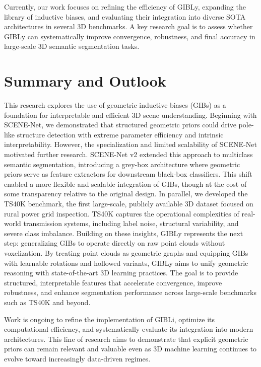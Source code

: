 Currently, our work focuses on refining the efficiency of GIBLy,
expanding the library of inductive biases, and evaluating their integration
into diverse SOTA architectures in several 3D benchmarks. A key research goal
is to assess whether GIBLy can systematically improve convergence, robustness,
and final accuracy in large-scale 3D semantic segmentation tasks.

\section{Summary and Outlook}\label{sec:summary_outlook}

This research explores the use of geometric inductive biases (GIBs) as a
foundation for interpretable and efficient 3D scene understanding. Beginning
with SCENE-Net, we demonstrated that structured geometric priors could drive
pole-like structure detection with extreme parameter efficiency and intrinsic
interpretability. However, the specialization and limited scalability of
SCENE-Net motivated further research.
%
SCENE-Net v2 extended this approach to multiclass semantic segmentation,
introducing a grey-box architecture where geometric priors serve as feature
extractors for downstream black-box classifiers. This shift enabled a more
flexible and scalable integration of GIBs, though at the cost of some
transparency relative to the original design.
%
In parallel, we developed the TS40K benchmark, the first large-scale, publicly
available 3D dataset focused on rural power grid inspection. TS40K captures the
operational complexities of real-world transmission systems, including label
noise, structural variability, and severe class imbalance.
%
Building on these insights, GIBLy represents the next step: generalizing GIBs
to operate directly on raw point clouds without voxelization. By treating point
clouds as geometric graphs and equipping GIBs with learnable rotations and
hollowed variants, GIBLy aims to unify geometric reasoning with
state-of-the-art 3D learning practices. The goal is to provide structured,
interpretable features that accelerate convergence, improve robustness, and
enhance segmentation performance across large-scale benchmarks such as TS40K
and beyond.

Work is ongoing to refine the implementation of GIBLi, optimize its
computational efficiency, and systematically evaluate its integration into
modern architectures. This line of research aims to demonstrate that explicit
geometric priors can remain relevant and valuable even as 3D machine learning
continues to evolve toward increasingly data-driven regimes.